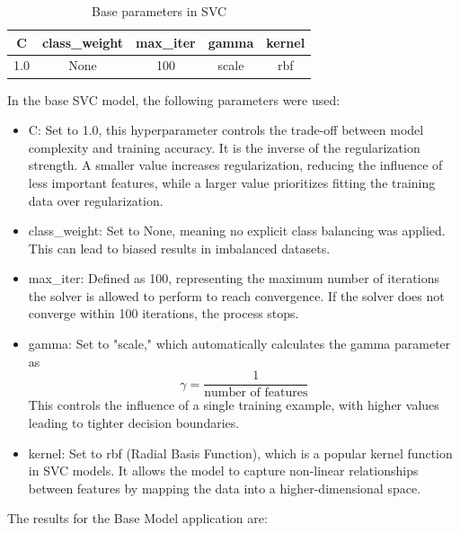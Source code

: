 \begin{table}[ht]
    \centering
    \caption{Base parameters in SVC} 
    \begin{tabular}{||c c c c c||} 
     \hline
     C & class\_weight & max\_iter & gamma & kernel \\ [0.5ex] 
     \hline\hline
     1.0 & None & 100 & scale & rbf \\ 
    \hline
    \end{tabular}
    \label{tab:tab1_svc}
\end{table}

In the base SVC model, the following parameters were used:

\begin{itemize}
    \item C: Set to 1.0, this hyperparameter controls the trade-off between model complexity and training accuracy. It is the inverse of the regularization strength. A smaller value increases regularization, reducing the influence of less important features, while a larger value prioritizes fitting the training data over regularization.
    \item class\_weight: Set to None, meaning no explicit class balancing was applied. This can lead to biased results in imbalanced datasets. 
    \item max\_iter: Defined as 100, representing the maximum number of iterations the solver is allowed to perform to reach convergence. If the solver does not converge within 100 iterations, the process stops. 
    \item gamma: Set to "scale," which automatically calculates the gamma parameter as \[
    \gamma = \frac{1}{\text{number of features}}
    \] This controls the influence of a single training example, with higher values leading to tighter decision boundaries.
    \item kernel: Set to rbf (Radial Basis Function), which is a popular kernel function in SVC models. It allows the model to capture non-linear relationships between features by mapping the data into a higher-dimensional space.
\end{itemize}

The results for the Base Model application are:

